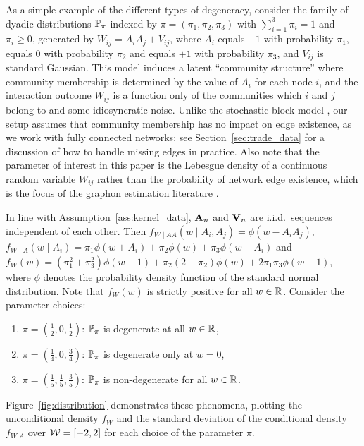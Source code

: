 As a simple example of the different types of degeneracy,
consider the family of dyadic distributions $\P_{\pi}$
indexed by $\pi = (\pi_1, \pi_2, \pi_3)$
with $\sum_{i=1}^3 \pi_i = 1$ and $\pi_i \geq 0$,
generated by $W_{i j} = A_i A_j + V_{i j}$,
where $A_i$ equals $-1$ with probability $\pi_1$,
equals $0$ with probability $\pi_2$
and equals $+1$ with probability $\pi_3$,
and $V_{i j}$ is standard Gaussian.
This model induces a latent
``community structure'' where community membership
is determined by the value of $A_i$ for each node $i$,
and the interaction outcome $W_{i j}$ is a function
only of the communities which $i$ and $j$ belong to and some
idiosyncratic noise.
Unlike the stochastic block model
\citep{kolaczyk2009statistical},
our setup assumes that
community membership has no impact on edge existence,
as we work with fully connected networks;
see Section~\ref{sec:trade_data} for a discussion of
how to handle missing edges in practice.
Also note that the parameter of interest in this paper is the Lebesgue density
of a continuous random variable $W_{i j}$
rather than the probability of network edge existence,
which is the focus of the graphon estimation
literature \citep{gao2021minimax}.

In line with Assumption~\ref{ass:kernel_data}, $\bA_n$ and $\bV_n$ are i.i.d.\
sequences independent of each other.
Then
$f_{W \mid AA}(w \mid A_i, A_j) = \phi(w - A_i A_j)$,\,
$f_{W \mid A}(w \mid A_i) = \pi_1 \phi(w + A_i) + \pi_2 \phi(w)
+ \pi_3 \phi(w - A_i)$
and
$f_W(w) = (\pi_1^2 + \pi_3^2) \phi(w-1) + \pi_2 (2 - \pi_2) \phi(w) + 2
\pi_1 \pi_3 \phi(w+1),$
where $\phi$ denotes the probability density function of
the standard normal distribution.
Note that $f_W(w)$ is strictly positive for all $w \in \R$.
Consider the parameter choices:
%
\begin{enumerate}[label=(\roman*)]\onehalfspacing

  \item $\pi = \left( \frac{1}{2}, 0, \frac{1}{2} \right)$:\quad
    $\P_\pi$ is degenerate at all $w \in \R$,

  \item $\pi = \left( \frac{1}{4}, 0, \frac{3}{4} \right)$:\quad
    $\P_\pi$ is degenerate only at $w=0$,

  \item $\pi = \left( \frac{1}{5}, \frac{1}{5}, \frac{3}{5} \right)$:\quad
    $\P_\pi$ is non-degenerate for all $w \in \R$.

\end{enumerate}
%
Figure~\ref{fig:distribution} demonstrates these phenomena,
plotting the unconditional density $f_W$
and the standard deviation of the conditional density $f_{W|A}$
over $\cW = [-2,2]$ for each choice of the parameter $\pi$.

